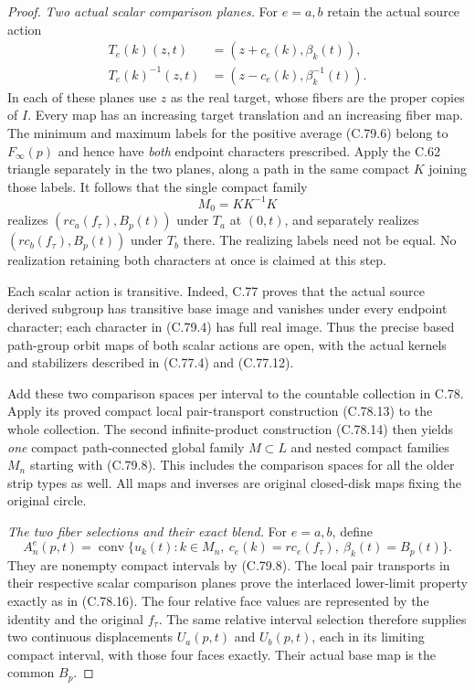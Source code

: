 \begin{proof}
\emph{Two actual scalar comparison planes.}
For $e=a,b$ retain the actual source action
\[
        \begin{split}
        T_e(k)(z,t)&=(z+c_e(k),\beta_k(t)),\\
        T_e(k)^{-1}(z,t)&=(z-c_e(k),\beta_k^{-1}(t)).
        \end{split}
                                                               \tag{C.79.7}
\]
In each of these planes use $z$ as the real
target, whose fibers are the proper copies
of $I$. Every map has an increasing target
translation and an increasing fiber map.
The minimum and maximum labels for the
positive average (C.79.6) belong to
$F_\infty(p)$ and hence have \emph{both}
endpoint characters prescribed. Apply the
C.62 triangle separately in the two planes,
along a path in the same compact $K$ joining
those labels. It follows that the single
compact family
\[
                         M_0=K K^{-1}K
                                                               \tag{C.79.8}
\]
realizes $(r c_a(f_\tau),B_p(t))$ under $T_a$
at $(0,t)$, and separately realizes
$(r c_b(f_\tau),B_p(t))$ under $T_b$ there.
The realizing labels need not be equal.
No realization retaining both characters
at once is claimed at this step.

Each scalar action is transitive. Indeed,
C.77 proves that the actual source derived
subgroup has transitive base image and
vanishes under every endpoint character;
each character in (C.79.4) has full real
image. Thus the precise based path-group
orbit maps of both scalar actions are open,
with the actual kernels and stabilizers
described in (C.77.4) and (C.77.12).

Add these two comparison spaces per interval
to the countable collection in C.78. Apply
its proved compact local pair-transport
construction (C.78.13) to the whole collection.
The second infinite-product construction
(C.78.14) then yields \emph{one} compact
path-connected global family $M\subset L$
and nested compact families $M_n$ starting
with (C.79.8). This includes the comparison
spaces for all the older strip types as well.
All maps and inverses are original closed-disk
maps fixing the original circle.

\emph{The two fiber selections and their exact blend.}
For $e=a,b$, define
\[
 A_n^e(p,t)=\operatorname{conv}
 \{u_k(t):k\in M_n,
       \ c_e(k)=r c_e(f_\tau),\ \beta_k(t)=B_p(t)\}.
                                                               \tag{C.79.9}
\]
They are nonempty compact intervals by
(C.79.8). The local pair transports in their
respective scalar comparison planes prove
the interlaced lower-limit property exactly
as in (C.78.16). The four relative face
values are represented by the identity
and the original $f_\tau$. The same relative
interval selection therefore supplies two
continuous displacements $U_a(p,t)$ and
$U_b(p,t)$, each in its limiting compact
interval, with those four faces exactly.
Their actual base map is the common $B_p$.


\end{proof}
